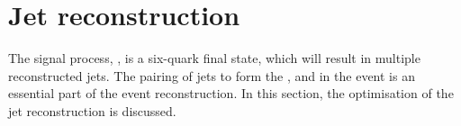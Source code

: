 \section{Jet reconstruction}

The signal process, \eeToHHbbWWHad, is a six-quark final state, which will result in multiple reconstructed jets. The pairing of jets to form the \PH, \PWplus and \PWminus in the event is an essential part of the event reconstruction. In this section, the optimisation of the jet reconstruction is discussed.




